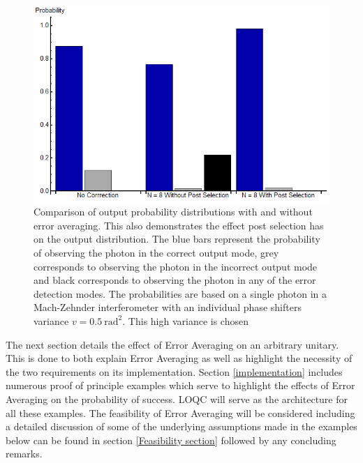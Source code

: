 \documentclass[aps,pra,twocolumn,superscriptaddress,numerical]{revtex4-1}
\begin{document}
	\begin{figure}
		\begin{centering}
			\includegraphics[width=\columnwidth]{prob_distributions.png}
			\par\end{centering}
		
		\caption[Comparison of output probability distributions with and without error averaging. ]{Comparison of output probability distributions with and without error 	averaging. This also demonstrates the effect post selection has on the output distribution. The blue bars represent the probability of observing the photon in the correct output mode, grey corresponds to observing the photon in the incorrect output mode and black corresponds to observing the photon in any of the error detection modes. The probabilities are based on a single photon in a Mach-Zehnder interferometer with an individual phase shifters variance $v=0.5\ \textrm{rad}^{2}$. This high variance is chosen  \label{fig:output_probabilities}}
	\end{figure}

	The next section details the effect of Error Averaging on an arbitrary unitary. This is done to both explain Error Averaging as well as highlight the necessity of the two requirements on its implementation. Section \ref{implementation} includes numerous proof of principle examples which serve to highlight the effects of Error Averaging on the probability of success. LOQC will serve as the architecture for all these examples. The feasibility of Error Averaging will be considered including a detailed discussion of some of the underlying assumptions made in the examples below can be found in section \ref{Feasibility section} followed by any concluding remarks.
	
\end{document}
